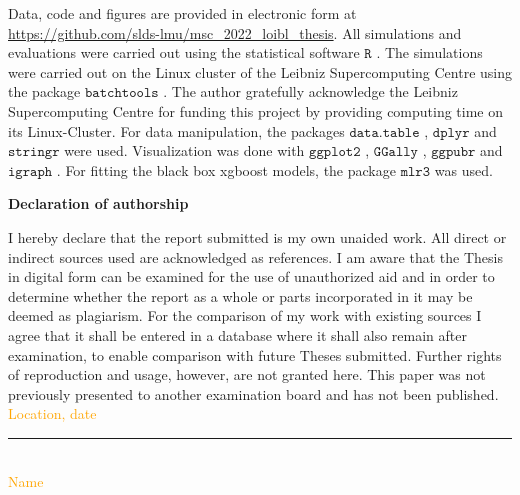 \documentclass[12pt]{article}
\begin{document}
Data, code and figures are provided in electronic form at \url{https://github.com/slds-lmu/msc_2022_loibl_thesis}.
All simulations and evaluations were carried out using the statistical software $\mathtt{R}$ \citep{RCoreTeam.2022}.
The simulations were carried out on the Linux cluster of the Leibniz Supercomputing Centre using the package $\mathtt{batchtools}$ \citep{Lang.2017}.
The author gratefully acknowledge the Leibniz Supercomputing Centre for funding this project by providing computing time on its Linux-Cluster.
For data manipulation, the packages $\mathtt{data.table}$ \citep{Dowle.2021}, $\mathtt{dplyr}$ \citep{Wickham.2022} and $\mathtt{stringr}$ \citep{Wickham.2022b} were used. Visualization was done with $\mathtt{ggplot2}$ \citep{Wickham.2016}, $\mathtt{GGally}$ \citep{Schloerke.2021}, $\mathtt{ggpubr}$ \citep{Kassambara.2020} and $\mathtt{igraph}$ \citep{Csardi.2006}. For fitting the black box xgboost models, the package $\mathtt{mlr3}$ \citep{Lang.2019} was used.

\newpage
\clearpage
    



\Large
\noindent
\textbf{Declaration of authorship} 
\vspace{0.5cm}
\noindent
\normalsize

I hereby declare that the report submitted is my own unaided work. All direct 
or indirect sources used are acknowledged as references. I am aware that the 
Thesis in digital form can be examined for the use of unauthorized aid and in 
order to determine whether the report as a whole or parts incorporated in it may 
be deemed as plagiarism. For the comparison of my work with existing sources I 
agree that it shall be entered in a database where it shall also remain after 
examination, to enable comparison with future Theses submitted. Further rights 
of reproduction and usage, however, are not granted here. This paper was not 
previously presented to another examination board and has not been published.
\\

\vspace{1cm}
\textcolor{orange}{Location, date} \\

\vspace{3cm}

\noindent\rule{0.5\textwidth}{0.4pt} \\

\textcolor{orange}{Name}

\end{document}
